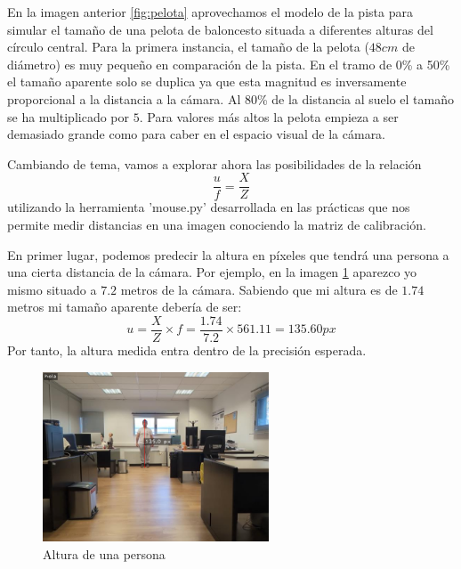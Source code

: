 \documentclass[12pt]{article}
\begin{document}
En la imagen anterior \ref{fig:pelota} aprovechamos el modelo de la pista para simular el tamaño de una pelota de baloncesto situada a diferentes alturas del círculo central.
Para la primera instancia, el tamaño de la pelota ($48 cm$ de diámetro) es muy pequeño en comparación de la pista. En el tramo de 0\% a 50\% el tamaño aparente solo se duplica ya que esta magnitud es inversamente proporcional a la distancia a la cámara.
Al 80\% de la distancia al suelo el tamaño se ha multiplicado por $5$. Para valores más altos la pelota empieza a ser demasiado grande como para caber en el espacio visual de la cámara.

Cambiando de tema, vamos a explorar ahora las posibilidades de la relación
$$
\frac{u}{f} = \frac{X}{Z}
$$
utilizando la herramienta 'mouse.py' desarrollada en las prácticas que nos permite medir distancias en una imagen conociendo la matriz de calibración.

En primer lugar, podemos predecir la altura en píxeles que tendrá una persona a una cierta distancia de la cámara. 
Por ejemplo, en la imagen \ref{fig:altura_persona} aparezco yo mismo situado a $7.2$ metros de la cámara. Sabiendo que mi altura es de $1.74$ metros mi tamaño aparente debería de ser:
$$u=\frac{X}{Z} \times f = \frac{1.74}{7.2} \times 561.11 = 135.60 px$$
Por tanto, la altura medida entra dentro de la precisión esperada.

\begin{figure}[H]
    \centering
    \includegraphics[width=0.6\textwidth]{images_calibracion/Altura_persona.png}  
    \caption{Altura de una persona}
    \label{fig:altura_persona}
\end{figure}
\end{document}

